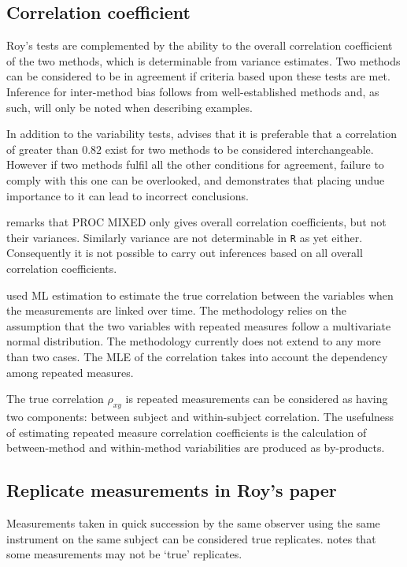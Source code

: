 \documentclass[12pt, a4paper]{report}
\theoremstyle{plain}
\theoremstyle{definition}
\theoremstyle{remark}
\begin{document}
	
	
	\subsection{Correlation coefficient}
	
	Roy's tests are complemented by the ability to the overall correlation coefficient of the two methods, which is determinable from variance estimates. Two methods can be considered to be in agreement if criteria based upon these tests are met. Inference for inter-method bias follows from well-established methods and, as such, will only be noted when describing examples.
	
	
	In addition to the variability tests, \citet{ARoy2009} advises that it is preferable that a correlation of greater than $0.82$ exist for two methods to be considered interchangeable. However if two methods fulfil all the other conditions for agreement, failure to comply with this one can be overlooked, and demonstrates that placing undue importance to it can lead to incorrect conclusions.
	
	\citet{ARoy2009} remarks that PROC MIXED only gives overall correlation coefficients, but not their variances. Similarly variance are not determinable in \texttt{R} as yet either. Consequently it is not possible to carry out inferences based on all overall correlation coefficients.
	
	\citet{lam} used ML estimation to estimate the true correlation between the variables when
	the measurements are linked over time. The methodology relies on the assumption that the two variables with repeated measures follow a multivariate normal distribution. The methodology currently does not extend to any more than two cases. The MLE of the correlation takes into account the dependency among repeated measures.
	
	The true correlation $\rho_{xy}$ is repeated measurements can be considered as having two components: between subject and within-subject correlation. The usefulness of estimating repeated measure correlation coefficients is the calculation of between-method and within-method variabilities are produced as by-products.
	
	
	\subsection{Replicate measurements in Roy's paper}
	Measurements taken in quick succession by the same observer using the same instrument on the same subject can be considered true replicates. \citet{ARoy2009} notes that some measurements may not be `true' replicates.
	
\end{document}
